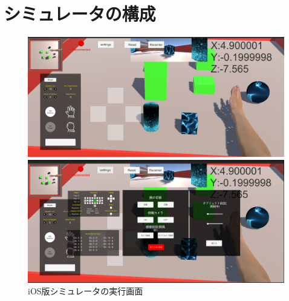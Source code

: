 \documentclass{ltjsreport}
\begin{document}
	\section{シミュレータの構成}
		\begin{figure}[H]
		\centering
		\begin{minipage}{0.75\columnwidth}
		\centering
		\includegraphics[width = \columnwidth]{../figs/iOSnomal.png}
		\end{minipage}
		\hspace{0.04\columnwidth}
		\begin{minipage}{0.75\columnwidth}
		\centering
		\includegraphics[width = \columnwidth]{../figs/iOSmenu.png}
		\end{minipage}
		\caption{iOS版シミュレータの実行画面}
		\label{fig:iOSsimulate}
		\end{figure}
	
\end{document}
